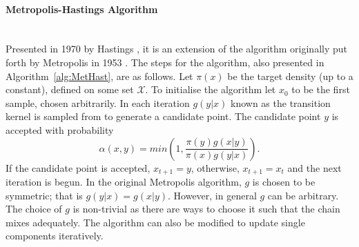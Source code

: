 	\paragraph{Metropolis-Hastings Algorithm}~\\
\noindent
	Presented in 1970 by Hastings \cite{hastings1970monte}, it is an extension of the algorithm originally put forth by Metropolis in 1953 \cite{metropolis1953equation}.
	The steps for the algorithm, also presented in Algorithm~\ref{alg:MetHast}, are as follows. Let $\pi(x)$ be the target density (up to a constant), defined on some set ${\mathscr X}$.
	To initialise the algorithm let $x_0$ to be the first sample, chosen arbitrarily. In each iteration $g(y|x)$ 
    known as the {transition kernel} is sampled from to generate a candidate point. The candidate point $y$ is accepted with probability 
	    \begin{equation}
	        \alpha(x,y) = min\left(1,\frac{\pi(y)g(x|y)}{\pi(x)g(y|x)}\right).
	    \end{equation}
	If the candidate point is accepted, $x_{t+1} = y$, otherwise, $x_{t+1} = x_t$ and the next iteration is begun. In the original Metropolis algorithm, $g$ is chosen to be symmetric; that is $g(y|x) = g(x|y)$. However, in general $g$ can be arbitrary. The choice of $g$ is non-trivial as there are ways to choose it such that the chain mixes adequately. The algorithm can also be modified to update single components iteratively. %
	
